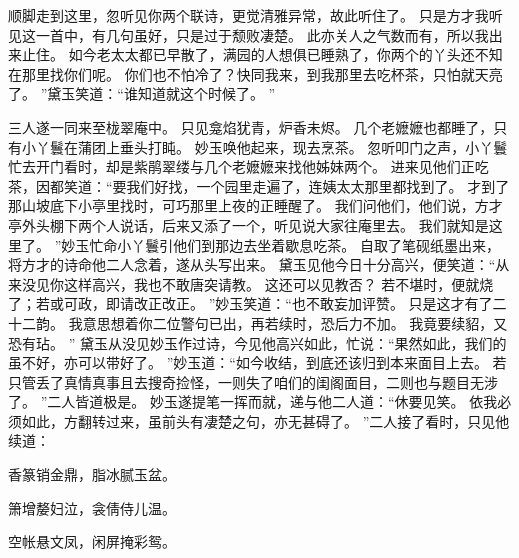 顺脚走到这里，忽听见你两个联诗，更觉清雅异常，故此听住了。
只是方才我听见这一首中，有几句虽好，只是过于颓败凄楚。
此亦关人之气数而有，所以我出来止住。
如今老太太都已早散了，满园的人想俱已睡熟了，你两个的丫头还不知在那里找你们呢。
你们也不怕冷了？快同我来，到我那里去吃杯茶，只怕就天亮了。
”黛玉笑道：“谁知道就这个时候了。
”\par
三人遂一同来至栊翠庵中。
只见龛焰犹青，炉香未烬。
几个老嬷嬷也都睡了，只有小丫鬟在蒲团上垂头打盹。
妙玉唤他起来，现去烹茶。
忽听叩门之声，小丫鬟忙去开门看时，却是紫鹃翠缕与几个老嬷嬷来找他姊妹两个。
进来见他们正吃茶，因都笑道：“要我们好找，一个园里走遍了，连姨太太那里都找到了。
才到了那山坡底下小亭里找时，可巧那里上夜的正睡醒了。
我们问他们，他们说，方才亭外头棚下两个人说话，后来又添了一个，听见说大家往庵里去。
我们就知是这里了。
”妙玉忙命小丫鬟引他们到那边去坐着歇息吃茶。
自取了笔砚纸墨出来，将方才的诗命他二人念着，遂从头写出来。
黛玉见他今日十分高兴，便笑道：“从来没见你这样高兴，我也不敢唐突请教。
这还可以见教否？
若不堪时，便就烧了；若或可政，即请改正改正。
”妙玉笑道：“也不敢妄加评赞。
只是这才有了二十二韵。
我意思想着你二位警句已出，再若续时，恐后力不加。
我竟要续貂，又恐有玷。
”
黛玉从没见妙玉作过诗，今见他高兴如此，忙说：“果然如此，我们的虽不好，亦可以带好了。
”妙玉道：“如今收结，到底还该归到本来面目上去。
若只管丢了真情真事且去搜奇捡怪，一则失了咱们的闺阁面目，二则也与题目无涉了。
”二人皆道极是。
妙玉遂提笔一挥而就，递与他二人道：“休要见笑。
依我必须如此，方翻转过来，虽前头有凄楚之句，亦无甚碍了。
”二人接了看时，只见他续道：\par
\hop
香篆销金鼎，脂冰腻玉盆。
\par
箫增嫠妇泣，衾倩侍儿温。
\par
空帐悬文凤，闲屏掩彩鸳。
\par
